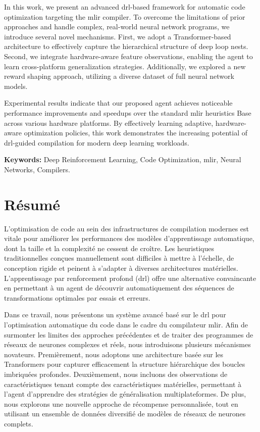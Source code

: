 \documentclass[12pt,a4paper]{report}
\begin{document}
In this work, we present an advanced \gls{drl}-based framework for automatic code optimization targeting the \gls{mlir} compiler. To overcome the limitations of prior approaches and handle complex, real-world neural network programs, we introduce several novel mechanisms. First, we adopt a Transformer-based architecture to effectively capture the hierarchical structure of deep loop nests. Second, we integrate hardware-aware feature observations, enabling the agent to learn cross-platform generalization strategies. Additionally, we explored a new reward shaping approach, utilizing a diverse dataset of full neural network models.

Experimental results indicate that our proposed agent achieves noticeable performance improvements and speedups over the standard \gls{mlir} heuristics Base across various hardware platforms. By effectively learning adaptive, hardware-aware optimization policies, this work demonstrates the increasing potential of \gls{drl}-guided compilation for modern deep learning workloads.

\vspace{0.5cm}
\noindent \textbf{Keywords:} Deep Reinforcement Learning, Code Optimization, \gls{mlir}, Neural Networks, Compilers.

\chapter*{Résumé}
L'optimisation de code au sein des infrastructures de compilation modernes est vitale pour améliorer les performances des modèles d'apprentissage automatique, dont la taille et la complexité ne cessent de croître. Les heuristiques traditionnelles conçues manuellement sont difficiles à mettre à l'échelle, de conception rigide et peinent à s'adapter à diverses architectures matérielles. L'apprentissage par renforcement profond (\gls{drl}) offre une alternative convaincante en permettant à un agent de découvrir automatiquement des séquences de transformations optimales par essais et erreurs.

Dans ce travail, nous présentons un système avancé basé sur le \gls{drl} pour l'optimisation automatique du code dans le cadre du compilateur \gls{mlir}. Afin de surmonter les limites des approches précédentes et de traiter des programmes de réseaux de neurones complexes et réels, nous introduisons plusieurs mécanismes novateurs. Premièrement, nous adoptons une architecture basée sur les Transformers pour capturer efficacement la structure hiérarchique des boucles imbriquées profondes. Deuxièmement, nous incluons des observations de caractéristiques tenant compte des caractéristiques matérielles, permettant à l'agent d'apprendre des stratégies de généralisation multiplateformes. De plus, nous explorons une nouvelle approche de récompense personnalisée, tout en utilisant un ensemble de données diversifié de modèles de réseaux de neurones complets.
\end{document}
